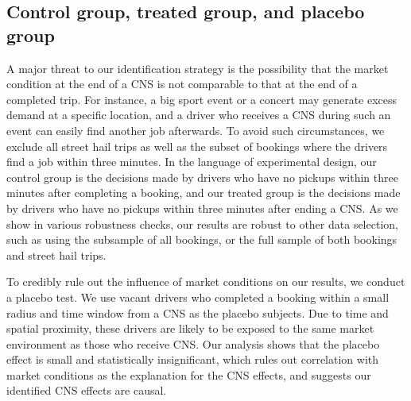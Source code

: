 \documentclass[reviewmode,AEJ]{AEA}
\begin{document}
\subsection{Control group, treated group, and placebo group}
A major threat to our identification strategy is the possibility that the market condition at the end of a CNS is not comparable to that at the end of a completed trip. For instance, a big sport event or a concert may generate excess demand at a specific location, and a driver who receives a CNS during such an event can easily find another job afterwards.
To avoid such circumstances, 
we exclude all street hail trips as well as the subset of bookings where the drivers find a job within three minutes. In the language of experimental design, our control group is the decisions made by drivers who have no pickups within three minutes after completing a booking, and our treated group is the decisions made by drivers who have no pickups within three minutes after ending a CNS. As we show in various robustness checks, our results are robust to other data selection, such as using the subsample of all bookings, or the full sample of both bookings and street hail trips.%

To credibly rule out the influence of market conditions on our results, we conduct a placebo test. We use vacant drivers who completed a booking within a small radius and time window from a CNS as the placebo subjects. Due to time and spatial proximity, these drivers are likely to be exposed to the same market environment as those who receive CNS.
Our analysis shows that the placebo effect is small and statistically insignificant, which rules out correlation with market conditions as the explanation for the CNS effects, and suggests our identified CNS effects are causal.
\end{document}
